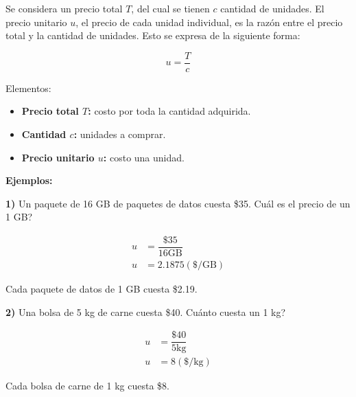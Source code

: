 Se considera un precio total $T$, del cual se tienen $c$ cantidad de unidades. El  precio unitario $u$, el precio de cada unidad individual, es la razón entre el precio total y la cantidad de unidades. Esto se expresa de la siguiente forma:

\[\boxed{
  u = \dfrac{T}{c}
}\]

Elementos:

\begin{itemize}
  \item \textbf{Precio total $T$:} costo por toda la cantidad adquirida.
  \item \textbf{Cantidad $c$:} unidades a comprar.
  \item \textbf{Precio unitario $u$:} costo una unidad.
\end{itemize}

\textbf{Ejemplos:}

\textbf{1)} Un paquete de 16 GB de paquetes de datos cuesta \$35. Cuál es el precio de un 1 GB?

\begin{align*}
  u &= \dfrac{\$35}{16 \text{GB}} \\
  u &= 2.1875 (\text{\$/GB})
\end{align*}

Cada paquete de datos de 1 GB cuesta \$2.19.

\textbf{2)} Una bolsa de 5 kg de carne cuesta \$40. Cuánto cuesta un 1 kg?

\begin{align*}
  u &= \dfrac{\$40}{5 \text{kg}} \\
  u &= 8 (\text{\$/kg})
\end{align*}

Cada bolsa de carne de 1 kg cuesta \$8.
